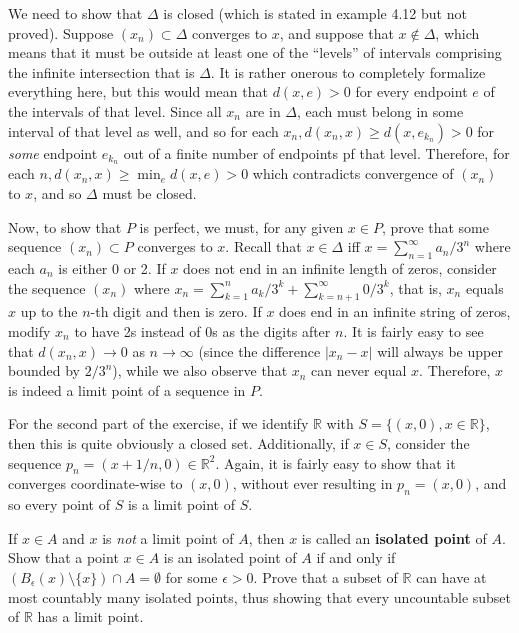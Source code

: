 \begin{solution}

    We need to show that $\Delta$ is closed (which is stated in example 4.12 but not proved).
    Suppose $(x_n) \subset \Delta$ converges to $x$, and suppose that $x \notin \Delta$, which means that it must be outside at least one of the ``levels'' of intervals comprising the infinite intersection that is $\Delta$.
    It is rather onerous to completely formalize everything here, but this would mean that $d(x, e) > 0$ for every endpoint $e$ of the intervals of that level.
    Since all $x_n$ are in $\Delta$, each must belong in some interval of that level as well, and so  for each $x_n, d(x_n, x) \geq d(x, e_{k_n}) > 0$ for \textit{some} endpoint $e_{k_n}$ out of a finite number of endpoints pf that level.
    Therefore, for each $n, d(x_n, x) \geq \min_e d(x, e) > 0$ which contradicts convergence of $(x_n)$ to $x$, and so $\Delta$ must be closed.

    Now, to show that $P$ is perfect, we must, for any given $x \in P$, prove that some sequence $(x_n) \subset P$ converges to $x$.
    Recall that $x \in \Delta$ iff $x = \sum_{n=1}^{\infty} a_n/3^n$ where each $a_n$ is either 0 or 2.
    If $x$ does not end in an infinite length of zeros, consider the sequence $(x_n)$ where $x_n = \sum_{k=1}^{n} a_k/3^k + \sum_{k=n+1}^{\infty} 0/3^k$, that is, $x_n$ equals $x$ up to the $n$-th digit and then is zero.
    If $x$ does end in an infinite string of zeros, modify $x_n$ to have 2s instead of 0s as the digits after $n$.
    It is fairly easy to see that $d(x_n, x) \rightarrow 0$ as $n \rightarrow \infty$ (since the difference $\lvert x_n - x \rvert$ will always be upper bounded by $2/3^n$), while we also observe that $x_n$ can never equal $x$. 
    Therefore, $x$ is indeed a limit point of a sequence in $P$.

    For the second part of the exercise, if we identify $\mathbb{R}$ with $S = \{(x, 0), x \in \mathbb{R}\}$, then this is quite obviously a closed set.
    Additionally, if $x \in S$, consider the sequence $p_n = (x + 1/n, 0) \in \mathbb{R}^2$.
    Again, it is fairly easy to show that it converges coordinate-wise to $(x, 0)$, without ever resulting in $p_n = (x, 0)$, and so every point of $S$ is a limit point of $S$.
\end{solution}

\begin{exercise}{40}
    If $x \in A$ and $x$ is \textit{not} a limit point of $A$, then $x$ is called an \textbf{isolated point} of $A$.
    Show that a point $x \in A$ is an isolated point of $A$ if and only if $(B_{\epsilon}(x) \setminus \{x\}) \cap A = \emptyset$ for some $\epsilon > 0$.
    Prove that a subset of $\mathbb{R}$ can have at most countably many isolated points, thus showing that every uncountable subset of $\mathbb{R}$ has a limit point.
\end{exercise}


